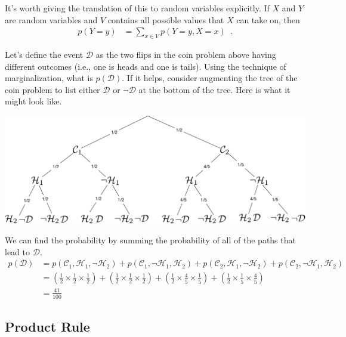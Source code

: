 \documentclass{tufte-handout}
\begin{document}
It's worth giving the translation of this to random variables explicitly.  If $X$ and $Y$ are random variables and $V$ contains all possible values that $X$ can take on, then
\begin{align}
p(Y=y) &= \sum_{x \in V} p(Y=y, X=x) \enspace .
\end{align}

\begin{exercise}
Let's define the event $\mathcal{D}$ as the two flips in the coin problem above having different outcomes (i.e., one is heads and one is tails).  Using the technique of marginalization, what is $p(\mathcal{D})$.  If it helps, consider augmenting the tree of the coin problem to list either $\mathcal{D}$ or $\neg \mathcal{D}$ at the bottom of the tree.  Here is what it might look like.

\begin{center}
\includegraphics[width=0.8\linewidth]{figures/twocoins_with_diff}
\end{center}
\begin{boxedsolution}
We can find the probability by summing the probability of all of the paths that lead to $\mathcal{D}$.
\begin{align}
p(\mathcal{D}) &= p(\mathcal{C}_1, \mathcal{H}_1, \neg \mathcal{H}_2) + p(\mathcal{C}_1,\neg \mathcal{H}_1, \mathcal{H}_2) + p(\mathcal{C}_2, \mathcal{H}_1, \neg \mathcal{H}_2) + p(\mathcal{C}_2,\neg \mathcal{H}_1, \mathcal{H}_2) \nonumber \\
&= \left ( \frac{1}{2} \times \frac{1}{2} \times \frac{1}{2} \right) +  \left ( \frac{1}{2} \times \frac{1}{2} \times \frac{1}{2} \right) +  \left ( \frac{1}{2} \times \frac{4}{5} \times \frac{1}{5} \right) +  \left ( \frac{1}{2} \times \frac{1}{5} \times \frac{4}{5} \right) \nonumber \\
&= \frac{41}{100} \nonumber
\end{align}
\end{boxedsolution}
\end{exercise}


\subsection{Product Rule}
\end{document}
